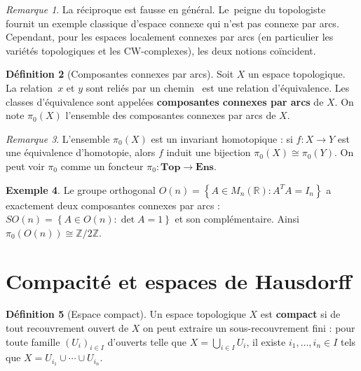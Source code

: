 \documentclass[12pt,a4paper,openany]{book}
\theoremstyle{definition}
\newtheorem{definition}{Définition}[chapter]
\newtheorem{exemple}[definition]{Exemple}
\theoremstyle{plain}
\theoremstyle{remark}
\newtheorem{remarque}[definition]{Remarque}
\newcommand{\Z}{\mathbb{Z}}
\newcommand{\R}{\mathbb{R}}
\newcommand{\set}[1]{\left\{#1\right\}}
\providecommand{\og}{\guillemotleft\,}
\providecommand{\fg}{\,\guillemotright}
\begin{document}
\begin{remarque}\label{rem:connexe-pas-arcs}
La réciproque est fausse en général. Le \og peigne du topologiste\fg{}
 fournit un exemple classique d'espace connexe qui
n'est pas connexe par arcs. Cependant, pour les espaces localement connexes par
arcs (en particulier les variétés topologiques et les CW-complexes), les deux
notions coïncident.
\end{remarque}

\begin{definition}[Composantes connexes par arcs]\label{def:composantes-arcs}
Soit $X$ un espace topologique. La relation \og $x$ et $y$ sont reliés par un
chemin \fg{} est une relation d'équivalence. Les classes d'équivalence sont
appelées \textbf{composantes connexes par arcs} de $X$. On note $\pi_0(X)$
 l'ensemble des composantes connexes par arcs de $X$.
\end{definition}

\begin{remarque}\label{rem:pi0-foncteur}
L'ensemble $\pi_0(X)$ est un invariant homotopique : si $f : X \to Y$ est une
équivalence d'homotopie, alors $f$ induit une bijection $\pi_0(X) \cong \pi_0(Y)$.
On peut voir $\pi_0$ comme un foncteur $\pi_0 : \mathbf{Top} \to \mathbf{Ens}$.
\end{remarque}

\begin{exemple}\label{ex:composantes-On}
Le groupe orthogonal $O(n) = \set{A \in M_n(\R) : A^T A = I_n}$ a exactement
deux composantes connexes par arcs : $SO(n) = \set{A \in O(n) : \det A = 1}$
et son complémentaire. Ainsi $\pi_0(O(n)) \cong \Z/2\Z$.
\end{exemple}

\section{Compacité et espaces de Hausdorff}\label{sec:compacite}

\begin{definition}[Espace compact]\label{def:compact}
Un espace topologique $X$ est \textbf{compact} si de tout recouvrement ouvert de
$X$ on peut extraire un sous-recouvrement fini : pour toute famille
$(U_i)_{i \in I}$ d'ouverts telle que $X = \bigcup_{i \in I} U_i$, il existe
$i_1, \ldots, i_n \in I$ tels que $X = U_{i_1} \cup \cdots \cup U_{i_n}$.
\end{definition}
\end{document}
